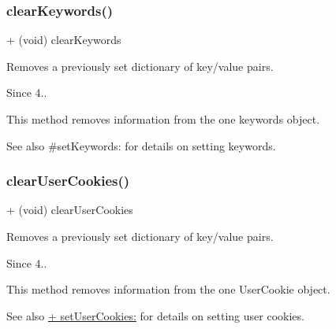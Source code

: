 \subsubsection{\texorpdfstring{clear\+Keywords()}{clearKeywords()}}
{\footnotesize\ttfamily + (void) clear\+Keywords \begin{DoxyParamCaption}{ }\end{DoxyParamCaption}}



Removes a previously set dictionary of key/value pairs. 

\begin{DoxySince}{Since}
4..
\end{DoxySince}
This method removes information from the one keywords object.

\begin{DoxySeeAlso}{See also}
\#set\+Keywords\+: for details on setting keywords. 
\end{DoxySeeAlso}
\mbox{\label{interfaceFlurryAds_a5bd6c927d8116fe1c39ac47b9c7015d2}} 
\subsubsection{\texorpdfstring{clear\+User\+Cookies()}{clearUserCookies()}}
{\footnotesize\ttfamily + (void) clear\+User\+Cookies \begin{DoxyParamCaption}{ }\end{DoxyParamCaption}}



Removes a previously set dictionary of key/value pairs. 

\begin{DoxySince}{Since}
4..
\end{DoxySince}
This method removes information from the one User\+Cookie object.

\begin{DoxySeeAlso}{See also}
\hyperlink{interfaceFlurryAds_ab24e531118ba482ff41fcf695a21de39}{+ set\+User\+Cookies\+:} for details on setting user cookies. 
\end{DoxySeeAlso}
\mbox{\label{interfaceFlurryAds_a0ae5e7f43964b0a0245bc21ef08cfdfa}} 
